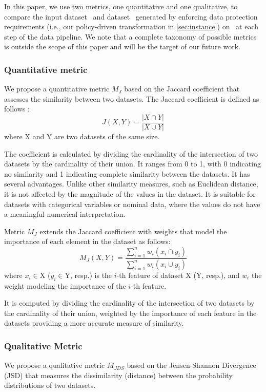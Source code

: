 In this paper, we use two metrics, one quantitative and one qualitative, to compare the input dataset \origdataset\ and dataset \transdataset\ generated by enforcing data protection requirements (i.e., our policy-driven transformation in \cref{sec:instance}) on \origdataset\ at each step of the data pipeline. We note that a complete taxonomy of possible metrics is outside the scope of this paper and will be the target of our future work.

\subsubsection{Quantitative metric}
We propose a quantitative metric $M_J$ based on the Jaccard coefficient that assesses the similarity between two datasets. The Jaccard coefficient is defined as follows \cite{RAHMAN20102707}: \[J(X,Y) = \frac{|X \cap Y|}{|X \cup Y|}\]
where X and Y are two datasets of the same size.

The coefficient is calculated by dividing the cardinality of the intersection of two datasets by the cardinality of their union. It ranges from 0 to 1, with 0 indicating no similarity and 1 indicating complete similarity between the datasets. It has several advantages. Unlike other similarity measures, such as Euclidean distance, it is not affected by the magnitude of the values in the dataset. It is suitable for datasets with categorical variables or nominal data, where the values do not have a meaningful numerical interpretation.

Metric $M_J$ extends the Jaccard coefficient with weights that model the importance of each element in the dataset as follows:\[M_J(X,Y) = \frac{\sum_{i=1}^{n}w_i(x_i \cap y_i)}{\sum_{i=1}^{n}w_i(x_i \cup y_i)}\]
where $x_i$$\in$X ($y_i$$\in$Y, resp.) is the $i$-th feature of dataset X (Y, resp.), and $w_i$ the weight modeling the importance of the $i$-th feature.

It is computed by dividing the cardinality of the intersection of two datasets by the cardinality of their union, weighted by the importance of each feature in the datasets providing a more accurate measure of similarity. %

\subsubsection{Qualitative Metric}
We propose a qualitative metric $M_{JDS}$ based on the Jensen-Shannon Divergence (JSD) that measures the dissimilarity (distance) between the probability distributions of two datasets.

